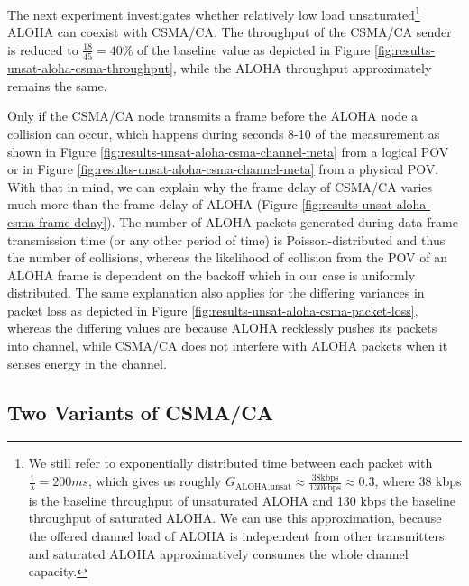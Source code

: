 The next experiment investigates whether relatively low load unsaturated\footnote{We still refer to exponentially distributed time between each packet with $\frac{1}{\lambda}=200ms$, which gives us roughly $G_\text{ALOHA,unsat} \approx \frac{38 \text{kbps}}{130 \text{kbps}}\approx 0.3$, where 38 kbps is the baseline throughput of unsaturated ALOHA and 130 kbps the baseline throughput of saturated ALOHA. We can use this approximation, because the offered channel load of ALOHA is independent from other transmitters and saturated ALOHA approximatively consumes the whole channel capacity.} ALOHA can coexist with CSMA/CA. The throughput of the CSMA/CA sender is reduced to $\frac{18}{45}=40\%$ of the baseline value as depicted in Figure \ref{fig:results-unsat-aloha-csma-throughput}, while the ALOHA throughput approximately remains the same.

Only if the CSMA/CA node transmits a frame before the ALOHA node a collision can occur, which happens during seconds 8-10 of the measurement as shown in Figure \ref{fig:results-unsat-aloha-csma-channel-meta} from a logical POV or in Figure \ref{fig:results-unsat-aloha-csma-channel-meta} from a physical POV. With that in mind, we can explain why the frame delay of CSMA/CA varies much more than the frame delay of ALOHA (Figure  \ref{fig:results-unsat-aloha-csma-frame-delay}). The number of ALOHA packets generated during data frame transmission time (or any other period of time) is Poisson-distributed and thus the number of collisions, whereas the likelihood of collision from the POV of an ALOHA frame is dependent on the backoff which in our case is uniformly distributed. The same explanation also applies for the differing variances in packet loss as depicted in Figure \ref{fig:results-unsat-aloha-csma-packet-loss}, whereas the differing values are because ALOHA recklessly pushes its packets into channel, while CSMA/CA does not interfere with ALOHA packets when it senses energy in the channel.

\clearpage

\subsection{Two Variants of CSMA/CA}

